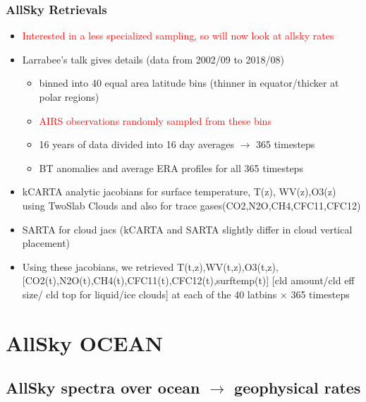 \documentclass[10pt,t]{beamer}
\begin{document}
\begin{frame}
  \frametitle{AllSky Retrievals}
  \begin{itemize}
    \item \textcolor{red}{Interested in a less specialized sampling, so will now look at allsky rates}
    \item Larrabee's talk gives details (data from 2002/09 to 2018/08)
      \begin{itemize}
        \item binned into 40 equal area latitude bins (thinner in equator/thicker at polar regions)
        \item \textcolor{red}{AIRS observations randomly sampled from these bins}
        \item 16 years of data divided into 16 day averages $\rightarrow$ 365 timesteps
        \item BT anomalies and average ERA profiles for all 365 timesteps
      \end{itemize}
    \item kCARTA analytic jacobians for surface temperature, T(z), WV(z),O3(z) using TwoSlab Clouds
          and also for trace gases(CO2,N2O,CH4,CFC11,CFC12)
    \item SARTA for cloud jacs (kCARTA and SARTA slightly differ in cloud vertical placement)
    \item Using these jacobians, we retrieved T(t,z),WV(t,z),O3(t,z),[CO2(t),N2O(t),CH4(t),CFC11(t),CFC12(t),surftemp(t)]
          [cld amount/cld eff size/ cld top for liquid/ice clouds] at each of the 40 latbins $\times $ 365 timesteps
  \end{itemize}
\end{frame}


\section{AllSky OCEAN}
\subsection{AllSky spectra over ocean $\rightarrow$ geophysical rates}
\end{document}
